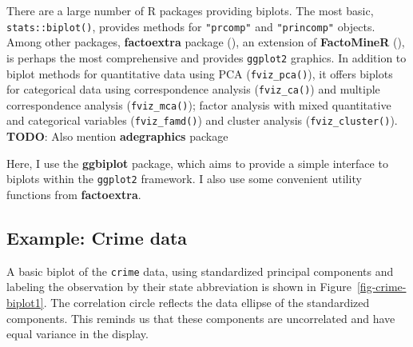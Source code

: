\documentclass[
  letterpaper,
  10pt,
  krantz2]{krantz}
\makeatletter
\newenvironment{Shaded}{\begin{snugshade}}{\end{snugshade}}
\newcommand{\AttributeTok}[1]{\textcolor[rgb]{0.40,0.45,0.13}{#1}}
\newcommand{\CommentTok}[1]{\textcolor[rgb]{0.37,0.37,0.37}{#1}}
\newcommand{\ConstantTok}[1]{\textcolor[rgb]{0.56,0.35,0.01}{#1}}
\newcommand{\DecValTok}[1]{\textcolor[rgb]{0.68,0.00,0.00}{#1}}
\newcommand{\FunctionTok}[1]{\textcolor[rgb]{0.28,0.35,0.67}{#1}}
\newcommand{\NormalTok}[1]{\textcolor[rgb]{0.00,0.23,0.31}{#1}}
\newcommand{\OtherTok}[1]{\textcolor[rgb]{0.00,0.23,0.31}{#1}}
\newcommand{\SpecialCharTok}[1]{\textcolor[rgb]{0.37,0.37,0.37}{#1}}
\newcommand{\StringTok}[1]{\textcolor[rgb]{0.13,0.47,0.30}{#1}}
\newenvironment{kframe}{%
  \medskip{}
  \setlength{\fboxsep}{.8em}
  \def\at@end@of@kframe{}%
  \ifinner\ifhmode%
  \def\at@end@of@kframe{\end{minipage}}%
  \begin{minipage}{\columnwidth}%
  \fi\fi%
  \def\FrameCommand##1{\hskip\@totalleftmargin \hskip-\fboxsep
  \colorbox{shadecolor}{##1}\hskip-\fboxsep
      \hskip-\linewidth \hskip-\@totalleftmargin \hskip\columnwidth}%
  \MakeFramed {\advance\hsize-\width
    \@totalleftmargin\z@ \linewidth\hsize
    \@setminipage}}%
{\par\unskip\endMakeFramed%
  \at@end@of@kframe}
\renewenvironment{Shaded}{\begin{kframe}}{\end{kframe}}
\makeatother
\begin{document}
There are a large number of R packages providing biplots. The most
basic, \texttt{stats::biplot()}, provides methods for \texttt{"prcomp"}
and \texttt{"princomp"} objects. Among other packages,
\textbf{factoextra} package (), an extension of \textbf{FactoMineR}
(), is perhaps the most
comprehensive and provides \texttt{ggplot2} graphics. In addition to
biplot methods for quantitative data using PCA (\texttt{fviz\_pca()}),
it offers biplots for categorical data using correspondence analysis
(\texttt{fviz\_ca()}) and multiple correspondence analysis
(\texttt{fviz\_mca()}); factor analysis with mixed quantitative and
categorical variables (\texttt{fviz\_famd()}) and cluster analysis
(\texttt{fviz\_cluster()}). \textbf{TODO}: Also mention
\textbf{adegraphics} package

Here, I use the \textbf{ggbiplot} package, which aims to provide a
simple interface to biplots within the \texttt{ggplot2} framework. I
also use some convenient utility functions from \textbf{factoextra}.

\subsection{Example: Crime data}\label{example-crime-data-1}

A basic biplot of the \texttt{crime} data, using standardized principal
components and labeling the observation by their state abbreviation is
shown in Figure~\ref{fig-crime-biplot1}. The correlation circle reflects
the data ellipse of the standardized components. This reminds us that
these components are uncorrelated and have equal variance in the
display.

\begin{Shaded}
\end{Shaded}
\end{document}
